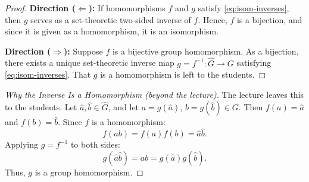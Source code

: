 \begin{content}


\begin{proof}
\textbf{Direction ($\Leftarrow$):} If homomorphisms $f$ and $g$ satisfy \eqref{eq:isom-inverses}, then $g$ serves as a set-theoretic two-sided inverse of $f$. Hence, $f$ is a bijection, and since it is given as a homomorphism, it is an isomorphism.

\textbf{Direction ($\Rightarrow$):} Suppose $f$ is a bijective group homomorphism. As a bijection, there exists a unique set-theoretic inverse map $g = f^{-1} \colon \hat{G} \to G$ satisfying \eqref{eq:isom-inverses}. That $g$ is a homomorphism is left to the students.
\end{proof}

\begin{proof}[Why the Inverse Is a Homomorphism (beyond the lecture)]
The lecture leaves this to the students. Let $\hat{a}, \hat{b} \in \hat{G}$, and let $a = g(\hat{a})$, $b = g(\hat{b}) \in G$. Then $f(a) = \hat{a}$ and $f(b) = \hat{b}$. Since $f$ is a homomorphism:
\[
f(ab) = f(a)f(b) = \hat{a}\hat{b}.
\]
Applying $g = f^{-1}$ to both sides:
\[
g(\hat{a}\hat{b}) = ab = g(\hat{a})g(\hat{b}).
\]
Thus, $g$ is a group homomorphism.
\end{proof}
\end{content}


